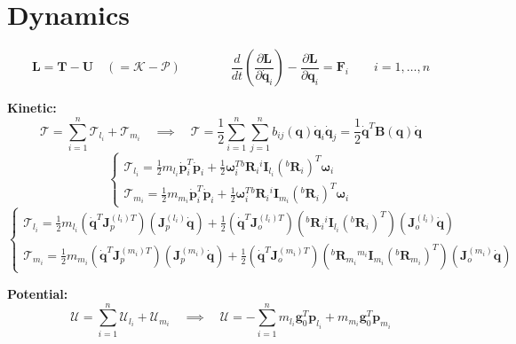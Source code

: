 \vspace*{-15pt}
\section{Dynamics}

\vspace*{-5pt}
$$
\mathcal{\bm{L} = \bm{T} - \bm{U} \quad (= K - P)}
\qquad
\qquad
\frac{d}{dt}\left(\frac{\partial \mathcal{\bm{L}}}{\partial \dot{\bm{q}}_i}\right)
-
\frac{\partial \mathcal{\bm{L}}}{\partial \bm{q}_i}
=
\mathcal{\bm{F}}_i
\qquad
i = 1, \dots, n
$$

\vspace*{10pt}
\textbf{Kinetic:} 
$$
\mathcal{T} = \sum_{i=1}^n \mathcal{T}_{l_i} + \mathcal{T}_{m_i}
\quad
\implies 
\quad
\mathcal{T}
= 
\frac{1}{2}
\sum_{i=1}^n
\sum_{j=1}^n
b_{ij}(\bm{q}) \dot{\bm{q}}_i \dot{\bm{q}}_j
=
\frac{1}{2} \dot{\bm{q}}^T \bm{B}(\bm{q}) \dot{\bm{q}}
$$
\vspace*{1pt}
$$
\begin{cases}
	\mathcal{T}_{l_i}
	=
	\frac{1}{2} m_{l_i} \bm{\dot{p}}_i^T \bm{\dot{p}}_i
	+
	\frac{1}{2} \bm{\omega}_i^T {}^b\bm{R}_i {}^i\bm{I}_{l_i} ({}^b\bm{R}_i)^T \bm{\omega}_i \\
	\mathcal{T}_{m_i}
	=
	\frac{1}{2} m_{m_i} \bm{\dot{p}}_i^T \bm{\dot{p}}_i
	+
	\frac{1}{2} \bm{\omega}_i^T {}^b\bm{R}_i {}^i\bm{I}_{m_i} ({}^b\bm{R}_i)^T \bm{\omega}_i
\end{cases}
$$
\vspace*{3pt}
$$
\begin{cases}
	\mathcal{T}_{l_i}
	=
	\frac{1}{2} m_{l_i} \left(\bm{\dot{q}}^T \bm{J}_p^{(l_i)T}\right) \left(\bm{J}_p^{(l_i)} \bm{\dot{q}}\right)
	+
	\frac{1}{2} 
	\left(\bm{\dot{q}}^T \bm{J}_o^{(l_i)T}\right)
	\left( {}^b\bm{R}_i {}^i\bm{I}_{l_i} ({}^b\bm{R}_i)^T \right)
	\left(\bm{J}_o^{(l_i)} \bm{\dot{q}}\right) \\
	\mathcal{T}_{m_i}
	=
	\frac{1}{2} m_{m_i} \left(\bm{\dot{q}}^T \bm{J}_p^{(m_i)T}\right) \left(\bm{J}_p^{(m_i)} \bm{\dot{q}}\right)
	+
	\frac{1}{2} 
	\left(\bm{\dot{q}}^T \bm{J}_o^{(m_i)T}\right)
	\left( {}^b\bm{R}_{m_i} {}^{m_i}\bm{I}_{m_i} ({}^b\bm{R}_{m_i})^T \right)
	\left(\bm{J}_o^{(m_i)} \bm{\dot{q}}\right)
\end{cases}
$$

\vspace*{10pt}
\textbf{Potential: }
\vspace*{-3pt}
$$
\mathcal{U} = \sum_{i=1}^n \mathcal{U}_{l_i} + \mathcal{U}_{m_i}
\quad
\implies 
\quad
\mathcal{U} = - \sum_{i=1}^n m_{l_i}\bm{g}_0^T \bm{p}_{l_i} + m_{m_i}\bm{g}_0^T \bm{p}_{m_i}
$$

